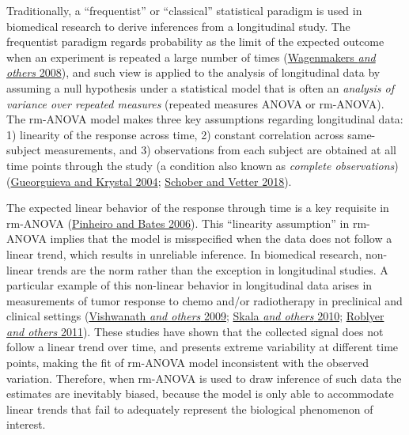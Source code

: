 \documentclass[
]{article}
\begin{document}
Traditionally, a ``frequentist'' or ``classical'' statistical paradigm is used in biomedical research to derive inferences from a longitudinal study. The frequentist paradigm regards probability as the limit of the expected outcome when an experiment is repeated a large number of times (\protect\hyperlink{ref-wagenmakers2008}{Wagenmakers \emph{and others} 2008}), and such view is applied to the analysis of longitudinal data by assuming a null hypothesis under a statistical model that is often an \emph{analysis of variance over repeated measures} (repeated measures ANOVA or rm-ANOVA). The rm-ANOVA model makes three key assumptions regarding longitudinal data: 1) linearity of the response across time, 2) constant correlation across same-subject measurements, and 3) observations from each subject are obtained at all time points through the study (a condition also known as \emph{complete observations}) (\protect\hyperlink{ref-gueorguieva2004}{Gueorguieva and Krystal 2004}; \protect\hyperlink{ref-schober2018}{Schober and Vetter 2018}).

The expected linear behavior of the response through time is a key requisite in rm-ANOVA (\protect\hyperlink{ref-pinheiro2006}{Pinheiro and Bates 2006}). This ``linearity assumption'' in rm-ANOVA implies that the model is misspecified when the data does not follow a linear trend, which results in unreliable inference. In biomedical research, non-linear trends are the norm rather than the exception in longitudinal studies. A particular example of this non-linear behavior in longitudinal data arises in measurements of tumor response to chemo and/or radiotherapy in preclinical and clinical settings (\protect\hyperlink{ref-vishwanath2009}{Vishwanath \emph{and others} 2009}; \protect\hyperlink{ref-skala2010}{Skala \emph{and others} 2010}; \protect\hyperlink{ref-roblyer2011}{Roblyer \emph{and others} 2011}). These studies have shown that the collected signal does not follow a linear trend over time, and presents extreme variability at different time points, making the fit of rm-ANOVA model inconsistent with the observed variation. Therefore, when rm-ANOVA is used to draw inference of such data the estimates are inevitably biased, because the model is only able to accommodate linear trends that fail to adequately represent the biological phenomenon of interest.
\end{document}
